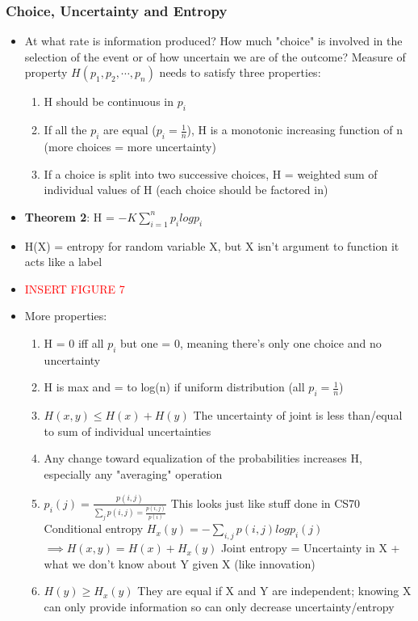 \documentclass[leqno,twocolumn]{article}
\begin{document}
\subsubsection{Choice, Uncertainty and Entropy}
\begin{itemize}
\item At what rate is information produced? How much "choice" is involved in the selection of the event or of how uncertain we are of the outcome? Measure of property $H(p_1,p_2,\cdots,p_n)$ needs to satisfy three properties:
\begin{enumerate}
\item H should be continuous in $p_i$
\item If all the $p_i$ are equal ($p_i = \frac{1}{n}$), H is a monotonic increasing function of n (more choices = more uncertainty)
\item If a choice is split into two successive choices, H = weighted sum of individual values of H (each choice should be factored in)
\end{enumerate}
\item \textbf{Theorem 2}: H = $-K\sum_{i=1}^n p_i logp_i $
\item H(X) = entropy for random variable X, but X isn't argument to function it acts like a label
\item \textcolor{red}{INSERT FIGURE 7}
\item More properties:
\begin{enumerate}
\item H = 0 iff all $p_i$ but one = 0, meaning there's only one choice and no uncertainty
\item H is max and = to log(n) if uniform distribution (all $p_i = \frac{1}{n}$)
\item $H(x,y) \leq H(x) + H(y)$ The uncertainty of joint is less than/equal to sum of individual uncertainties
\item Any change toward equalization of the probabilities increases H, especially any "averaging" operation
\item $p_i(j) = \frac{p(i,j)}{\sum_j p(i,j) = \frac{p(i,j)}{p(i)}}$ This looks just like stuff done in CS70\\
Conditional entropy $H_x(y) = -\sum_{i,j} p(i,j) log p_i(j)$\\
$\implies H(x,y) = H(x) + H_x(y)$ Joint entropy = Uncertainty in X + what we don't know about Y given X (like innovation)
\item $H(y) \geq H_x(y)$ They are equal if X and Y are independent; knowing X can only provide information so can only decrease uncertainty/entropy
\end{enumerate}
\end{itemize}
\end{document}
